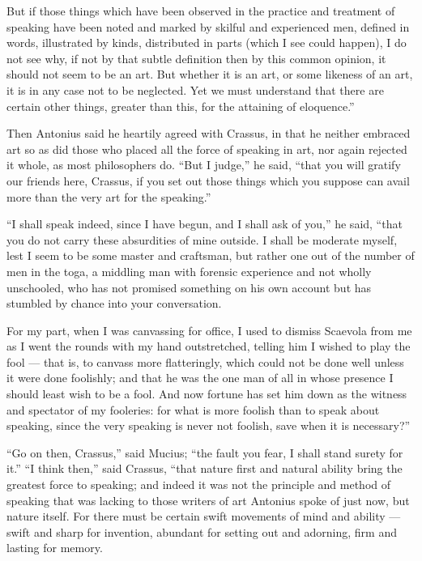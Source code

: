  But if those things which have been observed in the practice and treatment of speaking have been noted and marked by skilful and experienced men, defined in words, illustrated by kinds, distributed in parts (which I see could happen), I do not see why, if not by that subtle definition then by this common opinion, it should not seem to be an art. But whether it is an art, or some likeness of an art, it is in any case not to be neglected. Yet we must understand that there are certain other things, greater than this, for the attaining of eloquence.''

 Then Antonius said he heartily agreed with Crassus, in that he neither embraced art so as did those who placed all the force of speaking in art, nor again rejected it whole, as most philosophers do. ``But I judge,'' he said, ``that you will gratify our friends here, Crassus, if you set out those things which you suppose can avail more than the very art for the speaking.''

 ``I shall speak indeed, since I have begun, and I shall ask of you,'' he said, ``that you do not carry these absurdities of mine outside. I shall be moderate myself, lest I seem to be some master and craftsman, but rather one out of the number of men in the toga, a middling man with forensic experience and not wholly unschooled, who has not promised something on his own account but has stumbled by chance into your conversation.

 For my part, when I was canvassing for office, I used to dismiss Scaevola from me as I went the rounds with my hand outstretched, telling him I wished to play the fool — that is, to canvass more flatteringly, which could not be done well unless it were done foolishly; and that he was the one man of all in whose presence I should least wish to be a fool. And now fortune has set him down as the witness and spectator of my fooleries: for what is more foolish than to speak about speaking, since the very speaking is never not foolish, save when it is necessary?''

 ``Go on then, Crassus,'' said Mucius; ``the fault you fear, I shall stand surety for it.'' ``I think then,'' said Crassus, ``that nature first and natural ability bring the greatest force to speaking; and indeed it was not the principle and method of speaking that was lacking to those writers of art Antonius spoke of just now, but nature itself. For there must be certain swift movements of mind and ability — swift and sharp for invention, abundant for setting out and adorning, firm and lasting for memory.

